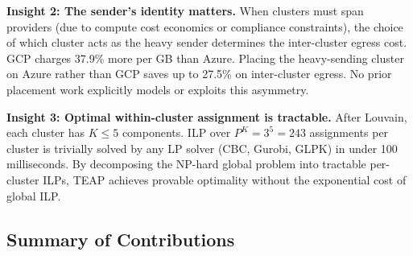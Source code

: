 \documentclass[10pt,journal]{IEEEtran}
\begin{document}
\textbf{Insight 2: The sender's identity matters.}
When clusters must span providers (due to compute cost economics or compliance
constraints), the choice of which cluster acts as the heavy sender determines
the inter-cluster egress cost.
GCP charges 37.9\% more per GB than Azure.
Placing the heavy-sending cluster on Azure rather than GCP saves up to 27.5\%
on inter-cluster egress.
No prior placement work explicitly models or exploits this asymmetry.

\textbf{Insight 3: Optimal within-cluster assignment is tractable.}
After Louvain, each cluster has $K \leq 5$ components.
ILP over $P^K = 3^5 = 243$ assignments per cluster is trivially solved by any
LP solver (CBC, Gurobi, GLPK) in under 100 milliseconds.
By decomposing the NP-hard global problem into tractable per-cluster ILPs,
TEAP achieves provable optimality without the exponential cost of global ILP.

\subsection{Summary of Contributions}
\end{document}
